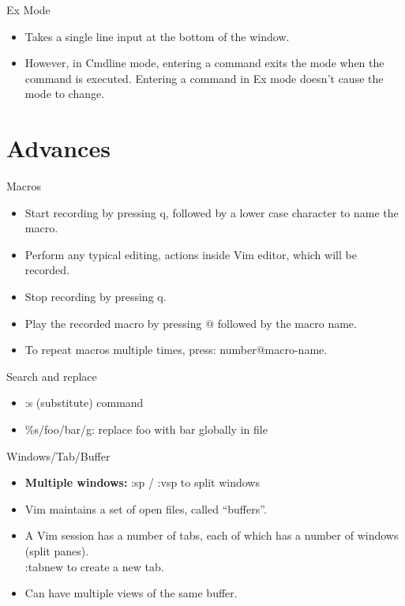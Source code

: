 \documentclass[10pt]{beamer}
\begin{document}
\begin{frame}{Ex Mode}
  \begin{itemize}
    \item Takes a single line input at the bottom of the window.
    \item However, in Cmdline mode, entering a command exits the mode when the command is executed. Entering a command in Ex mode doesn't cause the mode to change.
  \end{itemize}
\end{frame}

\section{Advances}
\begin{frame}{Macros}
  \begin{itemize}
    \item Start recording by pressing q, followed by a lower case character to name the macro.
    \item Perform any typical editing, actions inside Vim editor, which will be recorded.
    \item Stop recording by pressing q.
    \item Play the recorded macro by pressing $@$ followed by the macro name.
    \item To repeat macros multiple times, press: number$@$macro-name.
  \end{itemize}
\end{frame}

\begin{frame}{Search and replace}
\begin{itemize}
  \item :s (substitute) command

  \item \%s/foo/bar/g: replace foo with bar globally in file
\end{itemize}
\end{frame}

\begin{frame}{Windows/Tab/Buffer}
  \begin{itemize}
    \item \textbf{Multiple windows:} :sp / :vsp to split windows
    \item Vim maintains a set of open files, called “buffers”.
    \item A Vim session has a number of tabs, each of which has a number of windows (split panes). \\
    :tabnew to create a new tab.
    \item Can have multiple views of the same buffer.
  \end{itemize}
\end{frame}
\end{document}
